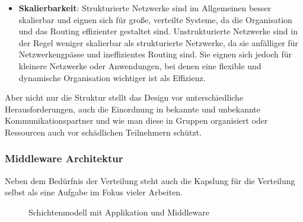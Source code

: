 \documentclass[../vs-script-first-v01.tex]{subfiles}
\begin{document}
\begin{itemize}
\item  \textbf{Skalierbarkeit}: Strukturierte Netzwerke sind im Allgemeinen besser skalierbar und eignen sich für große, verteilte Systeme, da die Organisation und das Routing effizienter gestaltet sind.
Unstrukturierte Netzwerke sind in der Regel weniger skalierbar als strukturierte Netzwerke, da sie anfälliger für Netzwerkengpässe und ineffizientes Routing sind. Sie eignen sich jedoch für kleinere Netzwerke oder Anwendungen, bei denen eine flexible und dynamische Organisation wichtiger ist als Effizienz.
\end{itemize} 
Aber nicht nur die Struktur stellt das Design vor unterschiedliche Herausforderungen, auch die Einordnung in bekannte und unbekannte Kommunikationspartner und wie man diese in Gruppen organisiert oder Ressourcen auch vor schädlichen Teilnehmern schützt.

\subsubsection{Middleware Architektur}
Neben dem Bedürfnis der Verteilung steht auch die Kapslung für die Verteilung selbst als eine Aufgabe im Fokus vieler Arbeiten. 

\begin{figure}[H]
    \centering
    \caption{Schichtenmodell mit Applikation und Middleware}
    \label{fig:schichtenmodell-II}
\end{figure}
\end{document}
